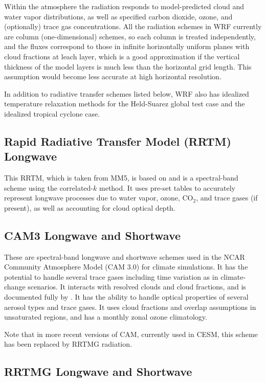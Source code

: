 Within the atmosphere the radiation responds to model-predicted 
cloud and water vapor distributions, as well as specified carbon dioxide, 
ozone, and (optionally) trace gas concentrations. All the radiation schemes 
in WRF currently are column (one-dimensional) schemes, so each column is 
treated independently, and the fluxes correspond to those in 
infinite horizontally uniform  planes with cloud fractions at leach layer, which
is a good approximation if the vertical thickness of the model layers is much 
less than the horizontal grid length. This assumption would become less 
accurate at high horizontal resolution.

In addition to radiative transfer schemes listed below, WRF also has idealized
temperature relaxation methods for the Held-Suarez global test case and the
idealized tropical cyclone case.

\subsection{Rapid Radiative Transfer Model (RRTM) Longwave}

This RRTM, which is taken from MM5, is based on \citet{mlawer97} 
and is a spectral-band scheme using the correlated-$k$ method. 
It uses pre-set tables to accurately represent longwave processes due 
to water vapor, ozone, CO$_2$, and trace gases (if present), as well as 
accounting for cloud optical depth.

\subsection {CAM3 Longwave and Shortwave}

These are spectral-band longwave and shortwave schemes used in the NCAR Community Atmosphere
Model (CAM 3.0) for climate simulations. It has the potential to handle
several trace gases including time variation as in climate-change scenarios. 
It interacts with resolved clouds and cloud fractions,
 and is documented fully by \citet{collins04}.  It has the ability to handle optical properties of
several aerosol types and trace gases. It uses cloud fractions and overlap assumptions
in unsaturated regions, and has a monthly zonal ozone climatology.
 
 Note that in more recent versions of CAM, currently used in CESM, this scheme has been replaced 
 by RRTMG radiation.
 
\subsection {RRTMG Longwave and Shortwave}

